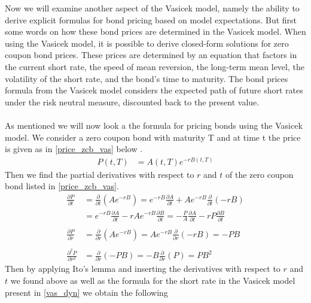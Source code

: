 Now we will examine another aspect of the Vasicek model, namely the ability to derive explicit formulas
for bond pricing based on model expectations.
But first some words on how these bond prices are determined in the Vasicek model. 
When using the Vasicek model, it is possible to derive closed-form solutions for zero coupon bond prices. 
These prices are determined by an equation that factors in the current short rate, the speed of mean reversion,
the long-term mean level, the volatility of the short rate, and the bond’s time to maturity.
The bond prices formula from the Vasicek model considers the expected path of future short 
rates under the risk neutral measure, discounted back to the present value. 
\\\\
As mentioned we will now look a the formula for pricing bonds using the Vasicek model. We consider a zero coupon bond
with maturity T and at time t the price is given as in \autoref{price_zcb_vas} below \cite{Bjork}.
\begin{align}
    P(t,T) &= A(t,T) e^{-rB(t,T)} 
    \label{price_zcb_vas} 
\end{align}
Then we find the partial derivatives with respect to $r$ and $t$ of the zero coupon bond listed in \autoref{price_zcb_vas}.
\begin{align*}
    \frac{\partial P}{\partial t} &= \frac{\partial}{\partial t} (Ae^{-rB}) 
    = e^{-rB} \frac{\partial A}{\partial t} + Ae^{-rB} \frac{\partial}{\partial t} (-rB) \\
    &= e^{-rB} \frac{\partial A}{\partial t} - rAe^{-rB} \frac{\partial B}{\partial t} = 
    - \frac{P}{A} \frac{\partial A}{\partial t} - rP \frac{\partial B}{\partial t}
    \\\\
    \frac{\partial P}{\partial r} &= \frac{\partial}{\partial r} (Ae^{-rB}) 
    = Ae^{-rB} \frac{\partial}{\partial r} (-rB) = -PB 
    \\\\
    \frac{\partial^2 P}{\partial r^2} &= \frac{\partial}{\partial r} (-PB) = -B \frac{\partial}{\partial r} (P) = PB^2
\end{align*}
Then by applying Ito's lemma \cite{Bjork} and inserting the derivatives with respect to $r$ and $t$ we found above as well as
 the formula for the short rate in the Vasicek model present in \autoref{vas_dyn} we obtain the following
